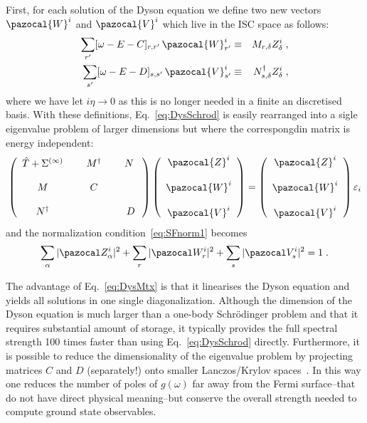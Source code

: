 First, for each solution of the Dyson equation we define two new vectors $\pazocal{W}^i$ and  $\pazocal{V}^i$ which live in the ISC space as follows:
\begin{eqnarray}
 \sum_{r'}  [\omega - E -C ]_{r,r'}  \, \pazocal{W}^i_{r'} &\equiv& M_{r,\delta}   Z^i_\delta  \; ,
 \nonumber \\
 \sum_{s'}  [\omega - E -D ]_{s,s'} \, \pazocal{V}^i_{s'} &\equiv& N^\dagger_{s,\delta}    Z^i_\delta \; ,
 \label{eq:defWV}
\end{eqnarray}
where we have let $i\eta\rightarrow 0$ as this is no longer needed in a finite an discretised basis. With these definitions, Eq.~\eqref{eq:DysSchrod}  is easily rearranged into a sigle eigenvalue problem of larger dimensions but where the correspongdin matrix is energy independent:
\begin{equation}
\left( \begin{array}{ccccc}
 \hat{T} + \Sigma^{(\infty)}  &~&   M^\dagger   &~&  N~  \\
&&\\
    M   &&  C  && \\
    &&\\
    N^\dagger    &&      &&  D
\end{array} \right)
\left( \begin{array}{c}
\pazocal{Z}^i \\ ~ \\ \pazocal{W}^i \\~ \\ \pazocal{V}^i
\end{array} \right)
=\left( \begin{array}{c}
  \pazocal{Z}^i \\ ~\\ \pazocal{W}^i \\~\\ \pazocal{V}^i
\end{array} \right)
  \varepsilon_i
\label{eq:DysMtx}
\end{equation}
and the normalization condition~\ref{eq:SFnorm1} becomes
\begin{equation}
\sum_\alpha  |\pazocal Z^i_\alpha|^2 + \sum_r  |\pazocal W^i_r|^2 + \sum_s  |\pazocal V^i_s|^2 = 1   \; .
\label{eq:SFnorm2}
\end{equation}

The advantage of Eq.~\eqref{eq:DysMtx} is that it linearises the Dyson equation and yields all solutions in one single diagonalization. Although the dimension of the Dyson equation is much larger than a one-body Schr\"odinger problem and that it requires substantial amount of storage, it typically provides the full spectral strength 100 times faster than using Eq.~\ref{eq:DysSchrod} directly. Furthermore, it is possible to reduce the dimensionality of the eigenvalue problem by projecting matrices $C$ and $D$ (separately!) onto smaller Lanczos/Krylov spaces~\cite{Schirmar9?,Som14a}. In this way one reduces the number of poles of $g(\omega)$ far away from the Fermi surface--that do not have direct physical meaning--but conserve the overall strength needed to compute ground state observables.

